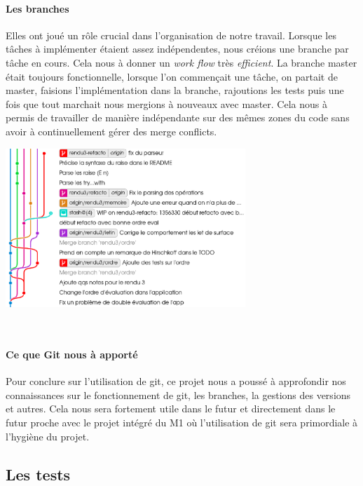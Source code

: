 \documentclass[14pt,a4paper]{extarticle}
\begin{document}
\hspace{-0.75cm}
\begin{minipage}[c]{0.5\linewidth}
    \paragraph{Les branches}
    Elles ont joué un rôle crucial dans l'organisation de notre
    travail. Lorsque les tâches à implémenter étaient assez
    indépendentes, nous créions une branche par tâche en cours. Cela
    nous à donner un \textit{work flow} très \textit{efficient}. La branche master était
    toujours fonctionnelle, lorsque l'on commençait une tâche, on partait
    de master, faisions l'implémentation dans la branche, rajoutions les
    tests puis une fois que tout marchait nous mergions à nouveaux avec
    master. Cela nous à permis de travailler de manière indépendante sur
    des mêmes zones du code sans avoir à continuellement gérer des merge
    conflicts.


\end{minipage}
\hfill%
\begin{minipage}[c]{.46\linewidth}
    \centering
    \includegraphics[height=6cm]{git_branching.png}
\end{minipage}\\[1cm]


\paragraph{Ce que Git nous à apporté}
Pour conclure sur l'utilisation de git, ce projet nous a poussé
à approfondir nos connaissances sur le fonctionnement de git, les
branches, la gestions des versions et autres. Cela nous sera fortement
utile dans le futur et directement dans le futur proche avec le projet intégré du
M1 où l'utilisation de git sera primordiale à l'hygiène du projet.

\subsection{Les tests}
\end{document}
